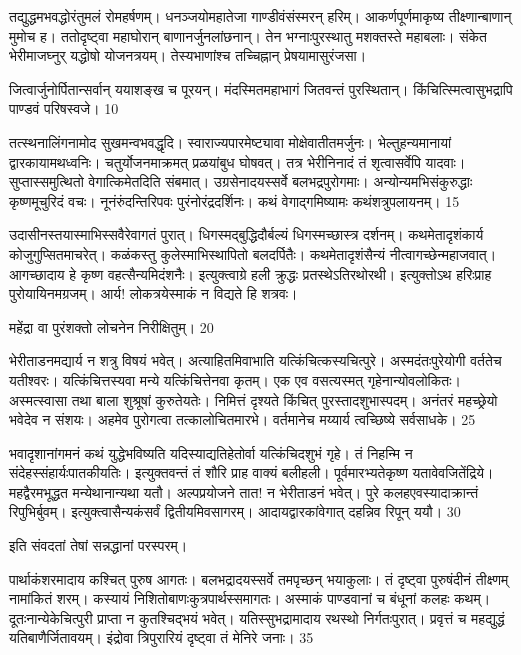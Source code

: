   तद्युद्धमभवद्धोरंतुमलं रोमहर्षणम्।
 धनञ्जयोमहातेजा गाण्डीवंसंस्मरन् हरिम्।
 आकर्णपूर्णमाकृष्य तीक्ष्णान्बाणान् मुमोच ह।
 ततोदृष्ट्वा महाघोरान् बाणानर्जुनलांछनान्।
 तेन भग्नाःपुरस्थातु मशक्तस्ते महाबलाः।
 संकेत भेरीमाजघ्नुर् यद्धोषो योजनत्रयम्।
 तेस्यभाणांश्च तच्चिह्नान् प्रेषयामासुरंजसा।
 
जित्वार्जुनोर्पितान्सर्वान् ययाशङ्ख च पूरयन्।
 मंदस्मितमहाभागं जितवन्तं पुरस्थितान्।
 किंचित्स्मित्वासुभद्रापि पाण्डवं परिषस्वजे।
 10

  तत्स्थनालिंगनामोद सुखमन्वभवद्धृदि।
 स्वाराज्यपारमेष्ट्यावा मोक्षेवातीतमर्जुनः।
 भेल्तुहन्यमानायां द्वारकायामथध्वनिः।
 चतुर्योजनमाक्रमत् प्रळयांबुध घोषवत्।
 तत्र भेरीनिनादं तं शृत्वासर्वेपि यादवाः।
 सुप्तास्समुत्थितो वेगात्किमेतदिति संबमात्।
 उग्रसेनादयस्सर्वे बलभद्रपुरोगमाः।
 अन्योन्यमभिसंकुरुद्धाः कृष्णमूचुरिदं वचः।
 नूनंरुंदन्तिरिपवः पुरंनोरंद्रदर्शिनः।
 कथं वेगाद्गमिष्यामः कथंशत्रुपलायनम्।
 15

  उदासीनस्तयास्माभिस्सवैरेवागतं पुरात्।
 धिगस्मद्बुद्धिदौर्बल्यं धिगस्मच्छास्त्र दर्शनम्।
 कथमेतादृशंकार्य कोजुगुप्सितमाचरेत्।
 कळंकस्तु कुलेस्माभिस्थापितो बलदर्पितैः।
 कथमेतादृशंसैन्यं नीत्वागच्छेन्महाजवात्।
 आगच्छादाय हे कृष्ण वहत्सैन्यमिदंशनैः।
 इत्युक्त्वाग्रे हली क्रुद्धः प्रतस्थेऽतिरथोरथी।
 इत्युक्तोऽथ हरिःप्राह पुरोयायिनमग्रजम्।
 आर्य! लोकत्रयेस्माकं न विद्यते हि शत्रवः।
 
महेंद्रा वा पुरंशक्तो लोचनेन निरीक्षितुम्।
20

 भेरीताडनमद्यार्य न शत्रु विषयं भवेत्।
 अत्याहितमिवाभाति यत्किंचित्कस्यचित्पुरे।
 अस्मदंतःपुरेयोगी वर्ततेच यतीश्वरः।
 यत्किंचित्तस्यवा मन्ये यत्किंचित्तेनवा कृतम्।
 एक एव वसत्यस्मत् गृहेनान्योवलोकितः।
 अस्मत्स्वासा तथा बाला शुश्रूषां कुरुतेयतेः।
 निमित्तं दृश्यते किंचित् पुरस्तादशुभास्पदम्।
 अनंतरं महच्छ्रेयो भवेदेव न संशयः।
 अहमेव पुरोगत्वा तत्कालोचितमारभे।
 वर्तमानेच मय्यार्य त्वच्छिष्ये सर्वसाधके।
 25

  भवादृशानांगमनं कथं युद्धेभविष्यति यदिस्याद्यतिहेतोर्वा यत्किंचिदशुभं गृहे।
 तं निहन्मि न संदेहस्संहार्यःपातकीयतिः।
 इत्युक्तवन्तं तं शौरि प्राह वाक्यं बलीहली।
 पूर्वमारभ्यतेकृष्ण यतावेवजितेंद्रिये।
 महद्वैरमभूद्धत मन्येथानान्यथा यतौ।
 अल्पप्रयोजने तात! न भेरीताडनं भवेत्।
 पुरे कलहएवस्यादाक्रान्तं रिपुभिर्बुवम्।
 इत्युक्त्वासैन्यकंसर्वं द्वितीयमिवसागरम्।
 आदायद्वारकांवेगात् दहन्निव रिपून् ययौ।
 30

  इति संवदतां तेषां सन्नद्धानां परस्परम्।
 
पार्थाकंशरमादाय कश्चित् पुरुष आगतः।
 बलभद्रादयस्सर्वे तमपृच्छन् भयाकुलाः।
 तं दृष्ट्वा पुरुषंदीनं तीक्ष्णम् नामांकितं शरम्।
 कस्यायं निशितोबाणःकुत्रपार्थस्समागतः।
 अस्माकं पाण्डवानां च बंधूनां कलहः कथम्।
 दूतःनान्येकेचित्पुरी प्राप्ता न कुतश्चिद्भयं भवेत्।
 यतिस्सुभद्रामादाय रथस्थो निर्गतःपुरात्।
 प्रवृत्तं च महद्युद्धं यतिबाणैर्जितावयम्।
 इंद्रोवा त्रिपुरारियं दृष्ट्वा तं मेनिरे जनाः।
 35

